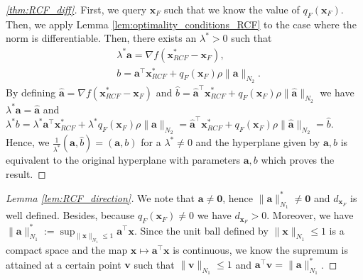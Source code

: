 \documentclass{article}
\begin{document}
{\begin{proof}[\cref{thm:RCF_diff}]
First, we query $\bm{x}_F$ such that we know the value of $q_F(\bm{x}_F)$. Then, we apply Lemma \ref{lem:optimality_conditions_RCF} to the case where the norm is differentiable. Then, there exists an $\lambda^*>0$ such that
\begin{align*}
    &\lambda^* \bm{a} = \nabla  f(\bm{x}_{RCF}^* - \bm{x}_F),\\
    &b=\bm{a}^\top \bm{x}_{RCF}^*+q_F(\bm{x}_F)\rho\|\bm{a}\|_{N_2}. 
\end{align*}
By defining $\hat{\bm{a}}=\nabla  f(\bm{x}_{RCF}^* - \bm{x}_F)$ and $\hat{b}=\hat{\bm{a}}^\top \bm{x}_{RCF}^*+q_F(\bm{x}_F)\rho\|\hat{\bm{a}}\|_{N_2}$ we have $\lambda^* \bm{a}=\hat{\bm{a}}$ and $\lambda^* b=\lambda^*\bm{a}^\top \bm{x}_{RCF}^*+\lambda^*q_F(\bm{x}_F)\rho\|\bm{a}\|_{N_2}=\hat{\bm{a}}^\top \bm{x}_{RCF}^*+q_F(\bm{x}_F)\rho\|\hat{\bm{a}}\|_{N_2}=\hat{b}$. Hence, we $\frac{1}{\lambda^*}(\hat{\bm{a}},\hat{b})=(\bm{a},b)$ for a $\lambda^*\neq 0$ and the hyperplane given by $\bm{a},b$ is equivalent to the original hyperplane with parameters $\bm{a},b$ which proves the result.
\end{proof}


\begin{proof}[Lemma \ref{lem:RCF_direction}]
    We note that $\bm{a}\neq\bm{0}$, hence $\|\bm{a}\|_{N_1}^*\neq\bm{0}$ and $d_{\bm{x}_F}$ is well defined. Besides, because $q_F(\bm{x}_F)\neq 0$ we have $d_{\bm{x}_F}>0$. Moreover, we have $\|\bm{a}\|_{N_1}^*:=\sup_{\|\bm{x}\|_{N_1}\leq 1}\bm{a}^{\top}\bm{x}$. Since the unit ball defined by $\|\bm{x}\|_{N_1}\leq 1$ is a compact space and the map $\bm{x} \mapsto \bm{a}^{\top}\bm{x}$ is continuous, we know the supremum is attained at a certain point $\bm{v}$ such that $\|\bm{v}\|_{N_1}\leq 1$ and $\bm{a}^{\top}\bm{v}=\|\bm{a}\|_{N_1}^*$.


\end{proof}}
\end{document}
